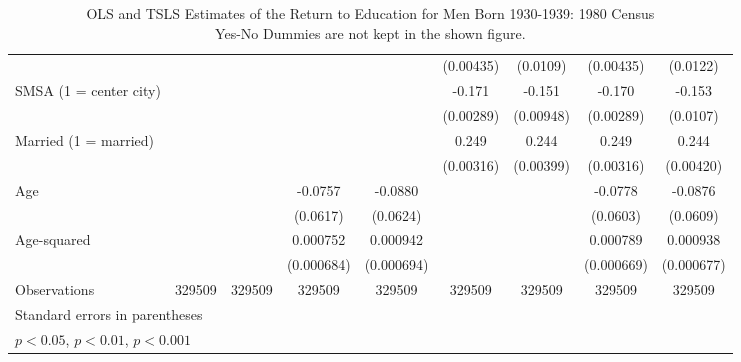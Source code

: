 \documentclass{article}
\begin{document}
\begin{landscape}
\begin{table}[htbp]
\begin{tabular}{l*{8}{c}}
                         &                     &                     &                     &                     &   (0.00435)         &    (0.0109)         &   (0.00435)         &    (0.0122)         \\
[1em]
SMSA (1 = center city)   &                     &                     &                     &                     &      -0.171\sym{***}&      -0.151\sym{***}&      -0.170\sym{***}&      -0.153\sym{***}\\
                         &                     &                     &                     &                     &   (0.00289)         &   (0.00948)         &   (0.00289)         &    (0.0107)         \\
[1em]
Married (1 = married)    &                     &                     &                     &                     &       0.249\sym{***}&       0.244\sym{***}&       0.249\sym{***}&       0.244\sym{***}\\
                         &                     &                     &                     &                     &   (0.00316)         &   (0.00399)         &   (0.00316)         &   (0.00420)         \\
[1em]
Age                      &                     &                     &     -0.0757         &     -0.0880         &                     &                     &     -0.0778         &     -0.0876         \\
                         &                     &                     &    (0.0617)         &    (0.0624)         &                     &                     &    (0.0603)         &    (0.0609)         \\
[1em]
Age-squared              &                     &                     &    0.000752         &    0.000942         &                     &                     &    0.000789         &    0.000938         \\
                         &                     &                     &  (0.000684)         &  (0.000694)         &                     &                     &  (0.000669)         &  (0.000677)         \\
\hline
Observations             &      329509         &      329509         &      329509         &      329509         &      329509         &      329509         &      329509         &      329509         \\
\hline\hline
\multicolumn{9}{l}{\footnotesize Standard errors in parentheses}\\
\multicolumn{9}{l}{\footnotesize \sym{*} \(p<0.05\), \sym{**} \(p<0.01\), \sym{***} \(p<0.001\)}\\
\end{tabular}
\caption[caption]{OLS and TSLS Estimates of the Return to Education for Men Born 1930-1939: 1980 Census \\\hspace{\textwidth}  Yes-No Dummies are not kept in the shown figure.}
\end{table}
\end{landscape}
\end{document}
